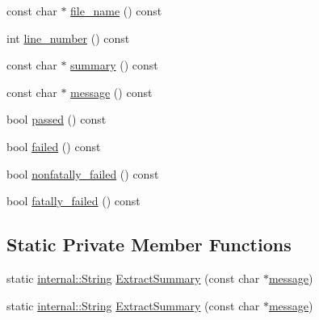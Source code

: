 \begin{DoxyCompactItemize}
\item 
const char $\ast$ \hyperlink{classtesting_1_1TestPartResult_a7ad9dbdbba7aafa3aa879707b7702b37}{file\-\_\-name} () const 
\item 
int \hyperlink{classtesting_1_1TestPartResult_aecdfe2926dd4e76f4e583b2c2ec67808}{line\-\_\-number} () const 
\item 
const char $\ast$ \hyperlink{classtesting_1_1TestPartResult_a7ffc48e369e736e843b93b714cf23885}{summary} () const 
\item 
const char $\ast$ \hyperlink{classtesting_1_1TestPartResult_a9477c5ee8f0751018d646f748d5730b0}{message} () const 
\item 
bool \hyperlink{classtesting_1_1TestPartResult_aa3e7216ead0f7e14a72132d181998138}{passed} () const 
\item 
bool \hyperlink{classtesting_1_1TestPartResult_a7b81417e1a230fb8b6f46e5ae68b25d9}{failed} () const 
\item 
bool \hyperlink{classtesting_1_1TestPartResult_ac9d4983902905a04ea6dc9b8de124a7e}{nonfatally\-\_\-failed} () const 
\item 
bool \hyperlink{classtesting_1_1TestPartResult_adda0e486d29cfd3961f0c4c0a6cba187}{fatally\-\_\-failed} () const 
\end{DoxyCompactItemize}
\subsection*{\-Static \-Private \-Member \-Functions}
\begin{DoxyCompactItemize}
\item 
static \hyperlink{classtesting_1_1internal_1_1String}{internal\-::\-String} \hyperlink{classtesting_1_1TestPartResult_a79f1ee719df1a31e2f27824441291527}{\-Extract\-Summary} (const char $\ast$\hyperlink{classtesting_1_1TestPartResult_a9477c5ee8f0751018d646f748d5730b0}{message})
\item 
static \hyperlink{classtesting_1_1internal_1_1String}{internal\-::\-String} \hyperlink{classtesting_1_1TestPartResult_a565dd7f103f2c1184990c6fd421bdf0d}{\-Extract\-Summary} (const char $\ast$\hyperlink{classtesting_1_1TestPartResult_a9477c5ee8f0751018d646f748d5730b0}{message})
\end{DoxyCompactItemize}

